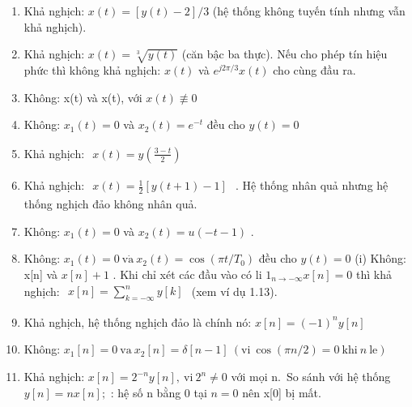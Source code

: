 \documentclass[
  10
]{article}
\begin{document}
\begin{enumerate}
\def\labelenumi{(\alph{enumi})}
\item
  Khả nghịch: \(x ( t ) = [ y ( t ) - 2 ] / 3\) (hệ thống không tuyến
  tính nhưng vẫn khả nghịch).
\item
  Khả nghịch: \(x ( t ) = \sqrt [ 3 ] { y ( t ) }\) (căn bậc ba thực).
  Nếu cho phép tín hiệu phức thì không khả nghịch: \(x ( t )\) và
  \(e ^ { j 2 \pi / 3 } x ( t )\) cho cùng đầu ra.
\item
  Không: x(t) và x(t), với \(x ( t ) \not \equiv 0\)
\item
  Không: \(x _ { 1 } ( t ) = 0\) và \(x _ { 2 } ( t ) = e ^ { - t }\)
  đều cho \(y ( t ) = 0\)
\item
  Khả nghịch:
  \(\begin{array} { r } { x ( t ) = y \left( \frac { 3 - t } { 2 } \right) } \end{array}\)
\item
  Khả nghịch:
  \(\begin{array} { r } { x ( t ) = \frac { 1 } { 2 } [ y ( t + 1 ) - 1 ] } \end{array}\)
  . Hệ thống nhân quả nhưng hệ thống nghịch đảo không nhân quả.
\item
  Không: \(x _ { 1 } ( t ) = 0\) và \(x _ { 2 } ( t ) = u ( - t - 1 )\)
  .
\item
  Không:
  \(x _ { 1 } ( t ) = 0 \ \mathrm { v { \dot { a } } } \ x _ { 2 } ( t ) = \cos ( \pi t / T _ { 0 } )\)
  đều cho \(y ( t ) = 0\) (i) Không: x{[}n{]} và \(x [ n ] + 1\) . Khi
  chỉ xét các đầu vào có li \(1 _ { n \to - \infty } x [ n ] = 0\) thì
  khả nghịch:
  \(\begin{array} { r } { x [ n ] = \sum _ { k = - \infty } ^ { n } y [ k ] } \end{array}\)
  (xem ví dụ 1.13).
\item
  Khả nghịch, hệ thống nghịch đảo là chính nó:
  \(x [ n ] = ( - 1 ) ^ { n } y [ n ]\)
\item
  Không:
  \(x _ { 1 } [ n ] = 0 { \mathrm { ~ v a ~ } } x _ { 2 } [ n ] = \delta [ n - 1 ] { \mathrm { ~ } } ( { \mathrm { v i ~ } } \cos ( \pi n / 2 ) = 0 { \mathrm { ~ k h i ~ } } n { \mathrm { ~ l e } } )\)
\item
  Khả nghịch:
  \(x [ n ] = 2 ^ { - n } y [ n ] , { \mathrm { ~ v i ~ } } 2 ^ { n } \neq 0\)
  với mọi n.~So sánh với hệ thống \(y [ n ] = n x [ n ] ;\) : hệ số n
  bằng 0 tại \(n = 0\) nên x{[}0{]} bị mất.
\end{enumerate}
\end{document}
